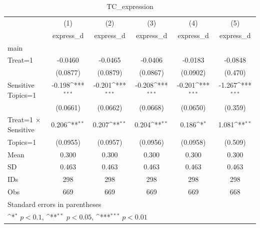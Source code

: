 \begin{table}[htbp]\centering
\def\sym#1{\ifmmode^{#1}\else\(^{#1}\)\fi}
\caption{TC\_expression}
\begin{tabular}{l*{5}{c}}
\hline\hline
                                &\multicolumn{1}{c}{(1)}&\multicolumn{1}{c}{(2)}&\multicolumn{1}{c}{(3)}&\multicolumn{1}{c}{(4)}&\multicolumn{1}{c}{(5)}\\
                                &\multicolumn{1}{c}{express\_d}&\multicolumn{1}{c}{express\_d}&\multicolumn{1}{c}{express\_d}&\multicolumn{1}{c}{express\_d}&\multicolumn{1}{c}{express\_d}\\
\hline
main                            &                  &                  &                  &                  &                  \\
Treat=1                         &  -0.0460         &  -0.0465         &  -0.0406         &  -0.0183         &  -0.0848         \\
                                & (0.0877)         & (0.0879)         & (0.0867)         & (0.0902)         &  (0.470)         \\
Sensitive Topics=1              &   -0.198\sym{***}&   -0.201\sym{***}&   -0.208\sym{***}&   -0.201\sym{***}&   -1.267\sym{***}\\
                                & (0.0661)         & (0.0662)         & (0.0668)         & (0.0650)         &  (0.359)         \\
Treat=1 $\times$ Sensitive      &    0.206\sym{**} &    0.207\sym{**} &    0.204\sym{**} &    0.186\sym{*}  &    1.081\sym{**} \\
Topics=1                        & (0.0955)         & (0.0957)         & (0.0956)         & (0.0958)         &  (0.509)         \\
\hline
Mean                            &    0.300         &    0.300         &    0.300         &    0.300         &    0.300         \\
SD                              &    0.463         &    0.463         &    0.463         &    0.463         &    0.463         \\
IDs                             &      298         &      298         &      298         &      298         &      298         \\
Obs                             &      669         &      669         &      669         &      669         &      668         \\
\hline\hline
\multicolumn{6}{l}{\footnotesize Standard errors in parentheses}\\
\multicolumn{6}{l}{\footnotesize \sym{*} \(p<0.1\), \sym{**} \(p<0.05\), \sym{***} \(p<0.01\)}\\
\end{tabular}
\end{table}
